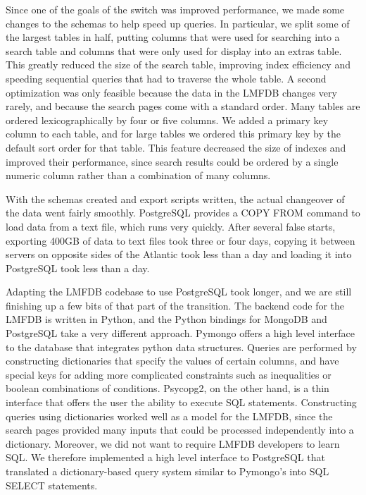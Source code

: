 \documentclass{article}
\begin{document}
Since one of the goals of the switch was improved performance, we made some changes to the schemas to help speed up queries.
In particular, we split some of the largest tables in half, putting columns that were used for searching into a search table and columns that were only used for display into an extras table.
This greatly reduced the size of the search table, improving index efficiency and speeding sequential queries that had to traverse the whole table.
A second optimization was only feasible because the data in the LMFDB changes very rarely, and because the search pages come with a standard order.
Many tables are ordered lexicographically by four or five columns.
We added a primary key column to each table, and for large tables we ordered this primary key by the default sort order for that table.
This feature decreased the size of indexes and improved their performance, since search results could be ordered by a single numeric column rather than a combination of many columns.

With the schemas created and export scripts written, the actual changeover of the data went fairly smoothly.
PostgreSQL provides a COPY FROM command to load data from a text file, which runs very quickly.
After several false starts, exporting 400GB of data to text files took three or four days, copying it between servers on opposite sides of the Atlantic took less than a day and loading it into PostgreSQL took less than a day.

Adapting the LMFDB codebase to use PostgreSQL took longer, and we are still finishing up a few bits of that part of the transition.
The backend code for the LMFDB is written in Python, and the Python bindings for MongoDB and PostgreSQL take a very different approach.
Pymongo offers a high level interface to the database that integrates python data structures.
Queries are performed by constructing dictionaries that specify the values of certain columns, and have special keys for adding more complicated constraints such as inequalities or boolean combinations of conditions.
Psycopg2, on the other hand, is a thin interface that offers the user the ability to execute SQL statements.
Constructing queries using dictionaries worked well as a model for the LMFDB, since the search pages provided many inputs that could be processed independently into a dictionary.
Moreover, we did not want to require LMFDB developers to learn SQL.
We therefore implemented a high level interface to PostgreSQL that translated a dictionary-based query system similar to Pymongo's into SQL SELECT statements.
\end{document}
